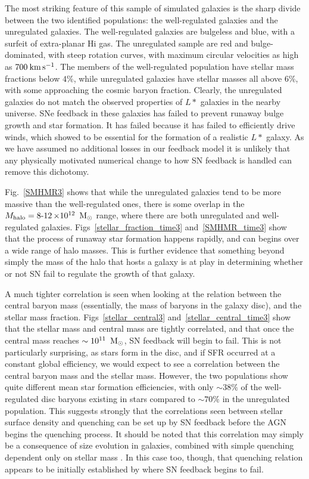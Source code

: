 The most striking feature of this sample of simulated galaxies is the sharp
divide between the two identified populations: the well-regulated galaxies and
the unregulated galaxies.  The well-regulated galaxies are bulgeless and blue,
with a surfeit of extra-planar {\sc Hi} gas.  The unregulated sample are red and
bulge-dominated, with steep rotation curves, with maximum circular velocities as
high as $700\>{\rm km}\,{\rm s}^{-1}$.  The members of the well-regulated population have stellar
mass fractions below $4\%$, while unregulated galaxies have stellar masses all
above $6\%$, with some approaching the cosmic baryon fraction.  Clearly, the
unregulated galaxies do not match the observed properties of $L*$ galaxies in
the nearby universe.  SNe feedback in these galaxies has failed to
prevent runaway bulge growth and star formation.  It has failed because it has
failed to efficiently drive winds, which \citet{Keller2015} showed to be
essential for the formation of a realistic $L*$ galaxy.    As we have assumed no
additional losses in our feedback model it is unlikely that any physically
motivated numerical change to how SN feedback is handled can remove this
dichotomy.

Fig.~\ref{SMHMR3} shows that while the unregulated galaxies tend to be more
massive than the well-regulated ones, there is some overlap in the $M_{\rm
halo}=\operatorname{8-12}\times10^{12}\;\>{\rm M_{\odot}}$ range, where there are both
unregulated and well-regulated galaxies.  Figs~\ref{stellar_fraction_time3}
and~\ref{SMHMR_time3} show that the process of runaway star formation happens
rapidly, and can begins over a wide range of halo masses.  This is further
evidence that something beyond simply the mass of the halo that hosts a galaxy
is at play in determining whether or not SN fail to regulate the growth of that
galaxy.

A much tighter correlation is seen when looking at the relation between the
central baryon mass (essentially, the mass of baryons in the galaxy disc), and
the stellar mass fraction.  Figs~\ref{stellar_central3}
and~\ref{stellar_central_time3} show that the stellar mass and central mass are
tightly correlated, and that once the central mass reaches $\sim10^{11}\;\>{\rm M_{\odot}}$,
SN feedback will begin to fail.  This is not particularly surprising, as stars
form in the disc, and if SFR occurred at a constant global efficiency, we would
expect to see a correlation between the central baryon mass and the stellar
mass.  However, the two populations show quite different mean star formation
efficiencies, with only $\sim38\%$ of the well-regulated disc baryons existing
in stars compared to $\sim70\%$ in the unregulated population.  This suggests
strongly that the correlations seen between stellar surface density and
quenching \citep{Fang2013} can be set up by SN 
feedback before the AGN begins the quenching process.  It should be noted that
this correlation may simply be a consequence of size evolution
in galaxies, combined with simple quenching dependent only on stellar mass
\citep{Peng2010,Lilly2016}.  In this case too, though, that quenching relation
appears to be initially established by where SN feedback begins to fail.

